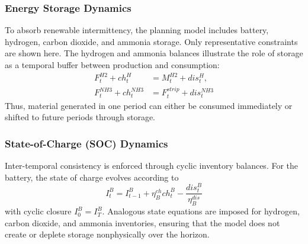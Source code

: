 \documentclass[letterpaper]{article}
\begin{document}
\subsubsection{Energy Storage Dynamics}
To absorb renewable intermittency, the planning model includes
battery, hydrogen, carbon dioxide, and ammonia storage. Only
representative constraints are shown here. The hydrogen and ammonia
balances illustrate the role of storage as a temporal buffer between
production and consumption:
\begin{equation}
\begin{aligned}
F^{H2}_t + ch^H_t &= M^{H2}_t + dis^H_t,\\
F^{NH3}_t + ch^{NH3}_t &= F^{strip}_t + dis^{NH3}_t
\end{aligned}
\end{equation}
Thus, material generated in one period can either be consumed
immediately or shifted to future periods through storage.

\subsubsection{State-of-Charge (SOC) Dynamics}
Inter-temporal consistency is enforced through cyclic inventory
balances. For the battery, the state of charge evolves according to
\begin{equation}
I^B_t = I^B_{t-1} + \eta_B^{ch} ch^B_t - \frac{dis^B_t}{\eta_B^{dis}}
\end{equation}
with cyclic closure $I^B_0 = I^B_T$. Analogous state equations are
imposed for hydrogen, carbon dioxide, and ammonia inventories,
ensuring that the model does not create or deplete storage
nonphysically over the horizon.
\end{document}
